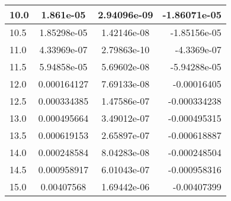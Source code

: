 \begin{tabular}{|l|c|c|r|}
        10.0 &  1.861e-05   & 2.94096e-09 & -1.86071e-05 \\ \hline
        10.5 &  1.85298e-05 & 1.42146e-08 & -1.85156e-05 \\ \hline
        11.0 &  4.33969e-07 & 2.79863e-10 & -4.3369e-07 \\ \hline
        11.5 &  5.94858e-05 & 5.69602e-08 & -5.94288e-05 \\ \hline
        12.0 &  0.000164127 & 7.69133e-08 & -0.00016405 \\ \hline
        12.5 &  0.000334385 & 1.47586e-07 & -0.000334238 \\ \hline
        13.0 &  0.000495664 & 3.49012e-07 & -0.000495315 \\ \hline
        13.5 &  0.000619153 & 2.65897e-07 & -0.000618887 \\ \hline
        14.0 &  0.000248584 & 8.04283e-08 & -0.000248504 \\ \hline
        14.5 &  0.000958917 & 6.01043e-07 & -0.000958316 \\ \hline
        15.0 &  0.00407568  & 1.69442e-06 & -0.00407399 \\ \hline
\end{tabular}
\label{tab:residual}
